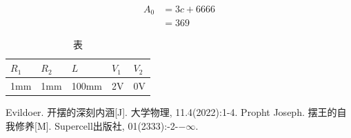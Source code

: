 \documentclass[12pt,a4paper]{article}%
\begin{document}
\begin{align}%
		A_0&=3c+6666\\%
		&=369
\end{align}


\begin{table}[H]%
	\centering
	\begin{tabular}{|l|l|l|l|l|}
		\hline
		$R_1$ & $R_2$ & $L$ & $V_1$ & $V_2$ \\ \hline
		1mm & 1mm & 100mm & 2V & 0V \\ \hline
	\end{tabular}
\caption{\fontsize{10pt}{15pt}\selectfont 表}
\end{table}

\newpage
\begin{thebibliography}{99}%
	Evildoer. 开摆的深刻内涵[J]. 大学物理, 11.4(2022):1-4.
	Propht Joseph. 摆王的自我修养[M]. Supercell出版社, 01(2333):-2-$-\infty$.
\end{thebibliography}
\end{document}
